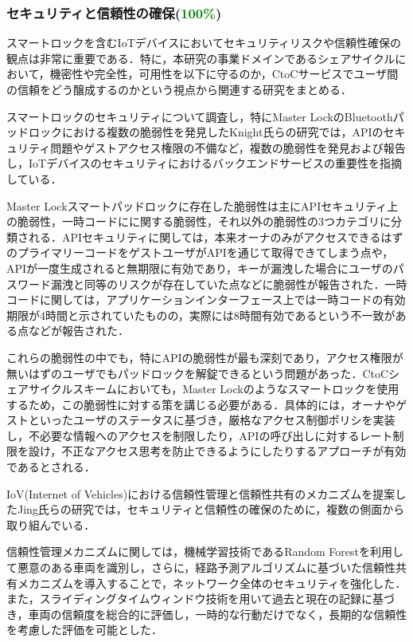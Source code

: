      \subsubsection{セキュリティと信頼性の確保(\textcolor{green}{100\%})}
        \label{sec:セキュリティと信頼性の確保}
          \par スマートロックを含むIoTデバイスにおいてセキュリティリスクや信頼性確保の観点は非常に重要である．特に，本研究の事業ドメインであるシェアサイクルにおいて，機密性や完全性，可用性を以下に守るのか，CtoCサービスでユーザ間の信頼をどう醸成するのかという視点から関連する研究をまとめる．
          \par スマートロックのセキュリティについて調査し，特にMaster LockのBluetoothパッドロックにおける複数の脆弱性を発見したKnight氏らの研究では，APIのセキュリティ問題やゲストアクセス権限の不備など，複数の脆弱性を発見および報告し，IoTデバイスのセキュリティにおけるバックエンドサービスの重要性を指摘している．
          \par Master Lockスマートパッドロックに存在した脆弱性は主にAPIセキュリティ上の脆弱性，一時コードにに関する脆弱性，それ以外の脆弱性の3つカテゴリに分類される．APIセキュリティに関しては，本来オーナのみがアクセスできるはずのプライマリーコードをゲストユーザがAPIを通じて取得できてしまう点や，APIが一度生成されると無期限に有効であり，キーが漏洩した場合にユーザのパスワード漏洩と同等のリスクが存在していた点などに脆弱性が報告された．一時コードに関しては，アプリケーションインターフェース上では一時コードの有効期限が4時間と示されていたものの，実際には8時間有効であるという不一致がある点などが報告された．
          \par これらの脆弱性の中でも，特にAPIの脆弱性が最も深刻であり，アクセス権限が無いはずのユーザでもパッドロックを解錠できるという問題があった．CtoCシェアサイクルスキームにおいても，Master Lockのようなスマートロックを使用するため，この脆弱性に対する策を講じる必要がある．具体的には，オーナやゲストといったユーザのステータスに基づき，厳格なアクセス制御ポリシを実装し，不必要な情報へのアクセスを制限したり，APIの呼び出しに対するレート制限を設け，不正なアクセス思考を防止できるようにしたりするアプローチが有効であるとされる．
          \par IoV(Internet of Vehicles)における信頼性管理と信頼性共有のメカニズムを提案したJing氏らの研究では，セキュリティと信頼性の確保のために，複数の側面から取り組んでいる．
          \par 信頼性管理メカニズムに関しては，機械学習技術であるRandom Forestを利用して悪意のある車両を識別し，さらに，経路予測アルゴリズムに基づいた信頼性共有メカニズムを導入することで，ネットワーク全体のセキュリティを強化した．また，スライディングタイムウィンドウ技術を用いて過去と現在の記録に基づき，車両の信頼度を総合的に評価し，一時的な行動だけでなく，長期的な信頼性を考慮した評価を可能とした．
